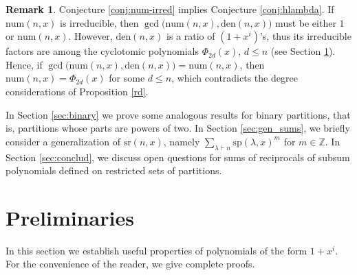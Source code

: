 \documentclass[reqno]{amsart}
\def\sp{\mathrm{sp}}
\def\sr{\mathrm{sr}}
\def\den{\mathrm{den}}
\def\num{\mathrm{num}}
\theoremstyle{definition}
\newtheorem{remark}{Remark}
\begin{document}
\begin{remark}\label{conj12}
 Conjecture \ref{conj:num-irred} implies Conjecture \ref{conj:hlambda}. If $\num(n,x)$ is irreducible, then $\gcd\bigl(\num(n,x),\den(n,x)\bigr)$ must be either $1$ or $\num(n,x)$. However, $\den(n,x)$ is a ratio of $(1+x^i)$'s, thus its irreducible factors are among the  cyclotomic polynomials $\Phi_{2d}(x)$, $d\leq n$ (see Section \ref{sec:prelim}). Hence, if $\gcd\bigl(\num(n,x),\den(n,x)\bigr)=\num(n,x)$, then $\num(n,x)=\Phi_{2d}(x)$ for some $d\leq n$, which  contradicts the degree considerations of Proposition \ref{rd}.
\end{remark}   


In Section \ref{sec:binary} we prove some analogous results for binary partitions, that is, partitions whose parts are powers of two. In Section \ref{sec:gen_sums}, we briefly consider a generalization of $\sr(n,x)$, namely $\sum_{\lambda \vdash n} \sp(\lambda, x)^m$ for $m\in \mathbb Z$. In Section \ref{sec:conclud}, we discuss open questions for sums of reciprocals of subsum polynomials defined on restricted sets of partitions.  








\section{Preliminaries} \label{sec:prelim}


In this section we establish useful properties of polynomials of the form $1+x^i$. For the convenience of the reader, we give complete proofs. 
\end{document}
